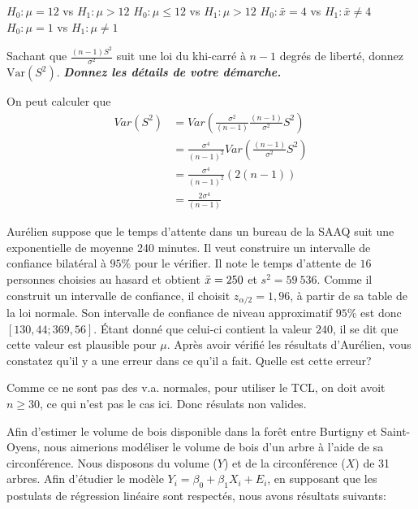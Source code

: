 \begin{questions}
\begin{checkboxes}
\correctchoice $H_0 : \mu = 12$ vs $H_1 : \mu > 12$
\choice $H_0 : \mu \leq 12$ vs $H_1 : \mu > 12$
\choice $H_0 : \bar{x} = 4$ vs $H_1 : \bar{x} \ne 4$
\correctchoice $H_0: \mu = 1$ vs $H_1: \mu \neq 1$
\end{checkboxes}
\newpage
\question[4]
Sachant que $\displaystyle \frac{(n-1)S^2}{\sigma^2}$ suit une loi du khi-carré à $n-1$ degrés de liberté, donnez $\text{Var}(S^2)$. \textbf{\textit{Donnez les détails de votre démarche.}}

\begin{solution}
On peut calculer que 
\begin{align*}
Var(S^2) &= Var\left( \frac{\sigma^2}{(n-1)}\frac{(n-1)}{\sigma^2}S^2 \right)\\
    &= \frac{\sigma^4}{(n-1)^2} Var\left(\frac{(n-1)}{\sigma^2}S^2\right)  \\
    &= \frac{\sigma^4}{(n-1)^2}(2(n-1)) \\
    &= \frac{2\sigma^4}{(n-1)}
\end{align*}
\end{solution}

\vspace{10cm}

\question[3]  Aurélien suppose que le temps d'attente dans un bureau de la SAAQ suit une exponentielle de moyenne 240 minutes. 
Il veut construire un intervalle de confiance bilatéral à $95\%$ pour le vérifier.
Il note le temps d'attente de $16$ personnes choisies au hasard et obtient $\Bar{x}=250$ et $s^2=59~536$.
Comme il construit un intervalle de confiance, il choisit $z_{\alpha/2}=1,96$, à partir de sa table de la loi normale.
Son intervalle de confiance de niveau approximatif $95\%$ est donc $[130,44;369,56]$.
Étant donné que celui-ci contient la valeur $240$, il se dit que cette valeur est plausible pour $\mu$. 
Après avoir vérifié les résultats d'Aurélien, vous constatez qu'il y a une erreur dans ce qu'il a fait. 
Quelle est cette erreur?
\begin{solution}
    Comme ce ne sont pas des v.a. normales, pour utiliser le TCL, on doit avoit $n\geq30$, ce qui n'est pas le cas ici. Donc résulats non valides.
\end{solution}
\newpage
\question\label{rls}

Afin d'estimer le volume de bois disponible dans la forêt entre Burtigny et Saint-Oyens, nous aimerions modéliser le volume de bois d'un arbre à l'aide de sa circonférence. Nous disposons du volume ($Y$) et de la circonférence ($X$) de 31 arbres. Afin d'étudier le modèle $Y_i = \beta_0 + \beta_1 X_i + E_i$, en supposant que les postulats de régression linéaire sont respectés, nous avons résultats suivants:


\end{questions}
